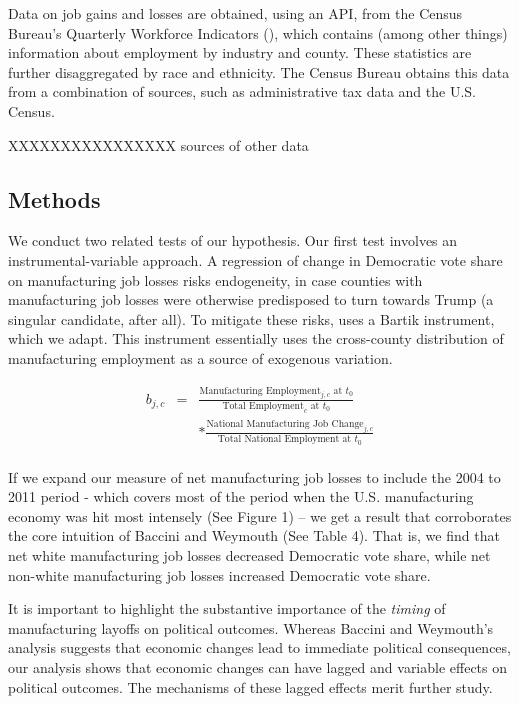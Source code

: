 \documentclass[]{AEA}
\begin{document}
Data on job gains and losses are obtained, using an API, from the Census
Bureau's Quarterly Workforce Indicators (\cite{QWI}), which contains
(among other things) information about employment by industry and
county. These statistics are further disaggregated by race and
ethnicity. The Census Bureau obtains this data from a combination of
sources, such as administrative tax data and the U.S. Census.

XXXXXXXXXXXXXXXX sources of other data

\subsection{Methods}

We conduct two related tests of our hypothesis. Our first test involves
an instrumental-variable approach. A regression of change in Democratic
vote share on manufacturing job losses risks endogeneity, in case
counties with manufacturing job losses were otherwise predisposed to
turn towards Trump (a singular candidate, after all). To mitigate these
risks, \cite{BW21} uses a Bartik instrument, which we adapt. This
instrument essentially uses the cross-county distribution of
manufacturing employment as a source of exogenous variation.

\[
\begin{aligned}
b_{j,c} &=& \frac{\text{Manufacturing Employment}_{j,c} \text{ at } t_0}{\text{Total Employment}_c \text{ at }t_0}  \\
&&  * \frac{\text{National Manufacturing Job Change}_{j,c} }{\text{Total National Employment at }t_0} \\
\end{aligned}
\]

If we expand our measure of net manufacturing job losses to include the
2004 to 2011 period - which covers most of the period when the U.S.
manufacturing economy was hit most intensely (See Figure 1) -- we get a
result that corroborates the core intuition of Baccini and Weymouth (See
Table 4). That is, we find that net white manufacturing job losses
decreased Democratic vote share, while net non-white manufacturing job
losses increased Democratic vote share.

It is important to highlight the substantive importance of the
\emph{timing} of manufacturing layoffs on political outcomes. Whereas
Baccini and Weymouth's analysis suggests that economic changes lead to
immediate political consequences, our analysis shows that economic
changes can have lagged and variable effects on political outcomes. The
mechanisms of these lagged effects merit further study.
\end{document}
